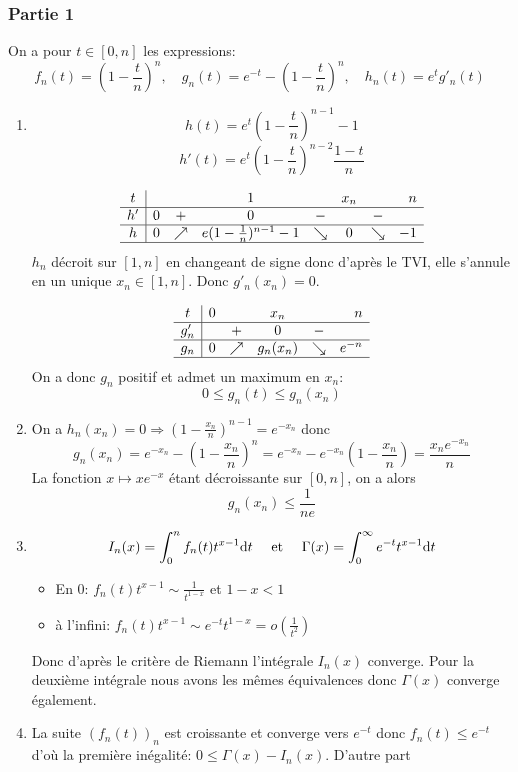 \documentclass{article}
\def \de {{\rm d}}
\begin{document}
\subsubsection*{Partie 1}
On a pour  $t\in [0,n]$ les expressions:
\[f_n(t)=(1-\frac tn)^n,\quad g_n(t)=e^{-t}-(1-\frac tn)^n,\quad h_n(t)=e^tg'_n(t)\] 
\begin{enumerate}
\item \[h(t)=e^t \left(1-\frac tn\right)^{n-1}-1\]
\[h'(t)=e^t \left(1-\frac tn\right)^{n-2}\frac{1-t}{n}\]

\[\begin{array}{c|lcccccr}
t&&&1&&x_n&&n \\ \hline
h'&0&+&0&-&&-&\\ \hline
h&0&\nearrow &e(1-\frac 1n)^{n-1}-1&\searrow&0&\searrow&-1\\ \hline
\end{array}\]
$h_n$ décroit sur $[1,n]$ en changeant de signe donc d'après le TVI, elle s'annule en un unique $x_n\in[1,n]$. Donc $g'_n(x_n)=0$.

\[\begin{array}{c|lcccr}
t&0&&x_n&&n \\ \hline
g'_n&&+&0&-&\\ \hline
g_n&0&\nearrow &g_n(x_n)&\searrow&e^{-n}\\ \hline
\end{array}\]
On a donc $g_n$ positif et admet un maximum en $x_n$:
\[0\leq g_n(t)\leq g_n(x_n)\]

\item On a $h_n(x_n)=0 \Longrightarrow (1-\frac{x_n}{n})^{n-1}=e^{-x_n}$ donc
\[g_n(x_n)=e^{-x_n}-(1-\frac{x_n}{n})^{n}=e^{-x_n}-e^{-x_n}(1-\frac{x_n}{n})=\frac{x_n e^{-x_n}}{n}\]
La fonction $x\mapsto xe^{-x}$ étant décroissante sur $[0,n]$, on a alors
 \[g_n(x_n)\leq \frac{1}{ne}\]
\item 
\[I_n(x)=\int_0^nf_n(t)t^{x-1}\de t\quad\mbox{ et }\quad \Gamma(x)=\int_0^\infty  e^{-t}t^{x-1}\de t\]
\begin{itemize}
\item En 0: $f_n(t)t^{x-1}\sim \frac{1}{t^{1-x}}$ et $1-x<1$
\item à l'infini: $f_n(t)t^{x-1}\sim e^{-t}t^{1-x}=o(\frac{1}{t^2})$
\end{itemize}
Donc d'après le critère de Riemann l'intégrale $I_n(x)$ converge. Pour la deuxième intégrale nous avons les mêmes équivalences donc $\Gamma(x)$ converge également.
\item La suite $(f_n(t))_n$ est croissante et converge vers $e^{-t}$ donc $f_n(t)\leq e^{-t}$ d'où la première inégalité: $0\leq \Gamma(x) - I_n(x)$. D'autre part


\end{enumerate}
\end{document}
